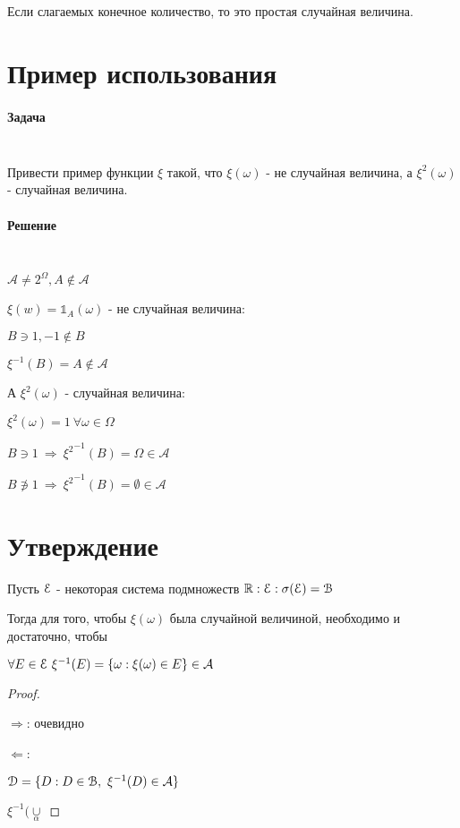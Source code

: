 \documentclass{report}
\newcommand{\A}{\mathcal{A}}
\renewcommand{\a}{\alpha}
\newcommand{\B}{\EuScript{B}}
\newcommand{\D}{\EuScript{D}}
\newcommand{\E}{\EuScript{E}}
\newcommand{\o}{\sigma}
\newcommand{\R}{\mathbb{R}}
\newcommand{\w}{\omega}
\newcommand{\W}{\Omega}
\newcommand{\1}{\mathds{1}}
\begin{document}
Если слагаемых конечное количество, то это простая случайная величина.
\section*{Пример использования}
\paragraph{Задача} $\phantom{1}$

Привести пример функции $\xi$ такой, что $\xi(\w)$ - не случайная величина, а $\xi^2(\w)$ - случайная величина.
\paragraph{Решение} $\phantom{1}$

$\A\neq2^\W, A\notin\A$

$\xi(w)=\1_A(\w)$ - не случайная величина:

$B \ni 1, -1\notin B$

$\xi^{-1}(B)=A\notin\A$

А $\xi^2(\w)$ - случайная величина:

$\xi^2(\w)=1\  \forall\w\in\W$

$B\ni1\  \Rightarrow\ {\xi^2}^{-1}(B)=\W\in\A$

$B\not\ni1\  \Rightarrow\ {\xi^2}^{-1}(B)=\emptyset\in\A$
\section*{Утверждение}
Пусть $\E$ - некоторая система подмножеств $\R:\E:\o(\E)=\B$

Тогда для того, чтобы $\xi(\w)$ была случайной величиной, необходимо и достаточно, чтобы

$\forall E\in\E\ \xi^{-1}(E)=\{\w:\xi(\w)\in E\}\in\A$
\begin{proof}$\phantom{1}$

$\Rightarrow$: очевидно

$\Leftarrow$:

$\D=\{D:D\in\B,\ \xi^{-1}(D)\in\A\}$

$\xi^{-1}(\underset{\a}{\cup}$
\end{proof}
\end{document}
